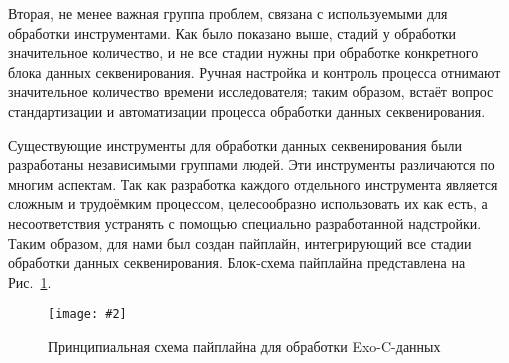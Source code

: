 \documentclass[a4paper,14pt]{extarticle}
\newcommand{\centerfigure}[5]
{\begin{figure}[#1]\centering\texttt{[image: \#2]}\caption{\label{#3}#4}\end{figure}}
\newcommand{\picref}[1]{Рис.~\ref{#1}}
\begin{document}
Вторая, не менее важная группа проблем, связана с используемыми для обработки инструментами.
Как было показано выше, стадий у обработки значительное количество, и не все стадии нужны при обработке конкретного блока данных секвенирования.
Ручная настройка и контроль процесса отнимают значительное количество времени исследователя;
таким образом, встаёт вопрос стандартизации и автоматизации процесса обработки данных секвенирования.

Существующие инструменты для обработки данных секвенирования были разработаны независимыми группами людей.
Эти инструменты различаются по многим аспектам.
% 
%
Так как разработка каждого отдельного инструмента является сложным и трудоёмким процессом, целесообразно использовать их как есть, а несоответствия устранять с помощью специально разработанной надстройки.
Таким образом, для нами был создан пайплайн, интегрирующий все стадии обработки данных секвенирования.
Блок-схема пайплайна представлена на \picref{fig:pipeline}.

\centerfigure{h}{BlockScheme.pdf}{fig:pipeline}{Принципиальная схема пайплайна для обработки Exo-C-данных}{1}
\end{document}
